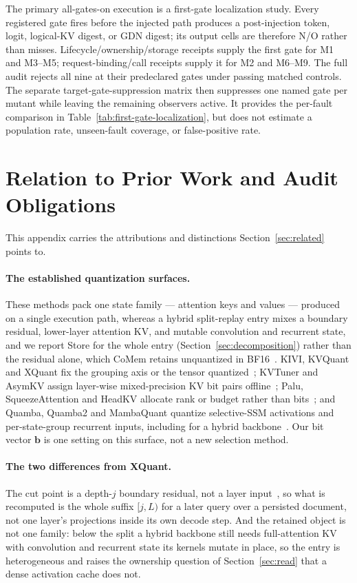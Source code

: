 \documentclass{article}
\begin{document}
The primary all-gates-on execution is a first-gate localization study. Every
registered gate fires before the injected path produces a post-injection
token, logit, logical-KV digest, or GDN digest; its output cells are therefore
N/O rather than misses. Lifecycle/ownership/storage receipts supply the first
gate for M1 and M3--M5; request-binding/call receipts supply it for M2 and
M6--M9. The full audit rejects all nine at their predeclared gates under
passing matched controls. The separate target-gate-suppression matrix then
suppresses one named gate per mutant while leaving the remaining observers
active. It provides the per-fault comparison in
Table~\ref{tab:first-gate-localization}, but does not estimate a population
rate, unseen-fault coverage, or false-positive rate.

\section{Relation to Prior Work and Audit Obligations}
\label{app:novelty-boundary}

This appendix carries the attributions and distinctions Section~\ref{sec:related}
points to.

\paragraph{The established quantization surfaces.}
These methods pack one state family --- attention keys and values --- produced
on a single execution path, whereas a hybrid split-replay entry mixes a boundary
residual, lower-layer attention KV, and mutable convolution and recurrent state,
and we report Store for the whole entry (Section~\ref{sec:decomposition}) rather
than the residual alone, which CoMem retains unquantized in
BF16~\citep{liu2026comem}.
KIVI, KVQuant and XQuant fix the grouping axis or the tensor
quantized~\citep{liu2024kivi,hooper2024kvquant,tomar2025xquant}; KVTuner and
AsymKV assign layer-wise mixed-precision KV bit pairs
offline~\citep{li2025kvtuner,tao2025asymkv,yang2024mikv}; Palu, SqueezeAttention
and HeadKV allocate rank or budget rather than
bits~\citep{chang2025palu,wang2025squeezeattention,fu2025headkv}; and Quamba,
Quamba2 and MambaQuant quantize selective-SSM activations and per-state-group
recurrent inputs, including for a hybrid
backbone~\citep{chiang2025quamba,chiang2025quamba2,yue2025mambaquant}.  Our bit
vector $\mathbf b$ is one setting on this surface, not a new selection method.

\paragraph{The two differences from XQuant.}
The cut point is a depth-$j$ boundary residual, not a layer
input~\citep{tomar2025xquant}, so what is recomputed is the whole suffix $[j,L)$
for a later query over a persisted document, not one layer's projections inside
its own decode step.  And the retained object is not one family: below the split
a hybrid backbone still needs full-attention KV with convolution and recurrent
state its kernels mutate in place, so the entry is heterogeneous and raises the
ownership question of Section~\ref{sec:read} that a dense activation cache does
not.
\end{document}
